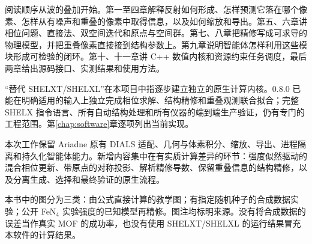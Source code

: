 \documentclass[11pt,oneside,openany]{book}
\begin{document}
阅读顺序从波的叠加开始。第一至四章解释反射如何形成、怎样预测它落在哪个像素、怎样从有噪声和重叠的像素中取得信息，以及如何缩放和导出。第五、六章讲相位问题、直接法、双空间迭代和原点与空间群。第七、八章把精修写成可求导的物理模型，并把重叠像素直接接到结构参数上。第九章说明智能体怎样利用这些模块形成可检验的闭环。第十、十一章讲 C++ 数值内核和资源约束任务调度，最后两章给出源码接口、实测结果和使用方法。

\begin{principle}
“替代 SHELXT/SHELXL”在本项目中指逐步建立独立的原生计算内核。0.8.0 已能在明确适用的输入上独立完成相位求解、结构精修和重叠观测联合拟合；完整 SHELX 指令语言、所有自动结构处理和所有仪器的端到端生产验证，仍有专门的工程范围。第\ref{chap:software}章逐项列出当前实现。
\end{principle}

本次工作保留 Ariadne 原有 DIALS 适配、几何与体素积分、缩放、导出、进程隔离和持久化智能体能力。新增内容集中在有实质计算差异的环节：强度似然驱动的混合相位更新、带原点的对称投影、解析精修导数、保留重叠信息的结构精修，以及分离生成、选择和最终验证的原生流程。

本书中的图分为三类：由公式直接计算的教学图；有指定随机种子的合成数据实验；公开 FeN$_4$ 实验强度的已知模型再精修。图注均标明来源。没有将合成数据的误差当作真实 MOF 的成功率，也没有使用 SHELXT/SHELXL 的运行结果冒充本软件的计算结果。

\begingroup\small\setlength{\parskip}{0pt}\linespread{0.96}\selectfont\tableofcontents\endgroup
\end{document}
